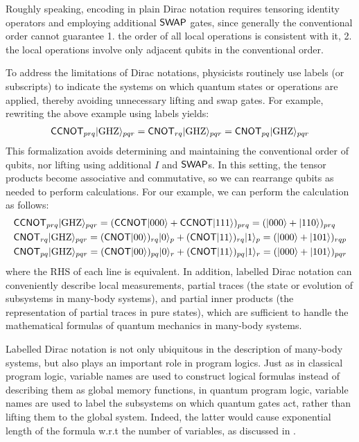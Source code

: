 \begin{example}
Roughly speaking, encoding in plain Dirac notation requires
tensoring identity operators and employing additional ${\mathsf{SWAP}}$ gates,
since generally the conventional order cannot guarantee 1. the order
of all local operations is consistent with it, 2. the local operations
involve only adjacent qubits in the conventional order.
\end{example}
To address the limitations of Dirac notations, physicists routinely
use labels (or subscripts) to indicate the systems on which quantum
states or operations are applied, thereby avoiding unnecessary lifting
and swap gates. For example, rewriting the above example using labels
yields:
\begin{align*}
  {\mathsf{CCNOT}}_{prq}|{\mathrm{GHZ}}\rangle_{pqr} = 
  {\mathsf{CNOT}}_{rq}|{\mathrm{GHZ}}\rangle_{pqr}
  = {\mathsf{CNOT}}_{pq}|{\mathrm{GHZ}}\rangle_{pqr}
\end{align*}
This formalization avoids determining and maintaining the conventional
order of qubits, nor lifting using additional $I$ and ${\mathsf{SWAP}}$s. In
this setting, the tensor products become associative and
commutative, so we can rearrange qubits as needed to
perform calculations. For our example, we can perform the calculation as
follows:
\begin{align*}
  &{\mathsf{CCNOT}}_{prq}|{\mathrm{GHZ}}\rangle_{pqr}
  = ({\mathsf{CCNOT}}|000\rangle + {\mathsf{CCNOT}}|111\rangle)_{prq}
  = (|000\rangle + |110\rangle)_{prq}\\
  &{\mathsf{CNOT}}_{rq}|{\mathrm{GHZ}}\rangle_{pqr}
  = ({\mathsf{CNOT}}|00\rangle)_{rq}|0\rangle_p + ({\mathsf{CNOT}}|11\rangle)_{rq}|1\rangle_p
  =(|000\rangle + |101\rangle)_{rqp}\\
  &{\mathsf{CNOT}}_{pq}|{\mathrm{GHZ}}\rangle_{pqr}
  = ({\mathsf{CNOT}}|00\rangle)_{pq}|0\rangle_r + ({\mathsf{CNOT}}|11\rangle)_{pq}|1\rangle_r
  = (|000\rangle + |101\rangle)_{pqr}
\end{align*}
where the RHS of each line is equivalent.  In addition, labelled
Dirac notation can conveniently describe local measurements, partial
traces (the state or evolution of subsystems in many-body systems),
and partial inner products (the representation of partial traces in
pure states), which are sufficient to handle the mathematical formulas
of quantum mechanics in many-body systems.

Labelled Dirac notation is not only ubiquitous in the description of many-body systems, but also plays an important role in program logics. Just as in classical program logic, variable names are used to construct logical formulas instead of describing them as global memory functions, in quantum program logic, variable names are used to label the subsystems on which quantum gates act, rather than lifting them to the global system. Indeed, the latter would cause exponential length of the formula w.r.t the number of variables, as discussed in \cite{QSL_Le_2022}.

